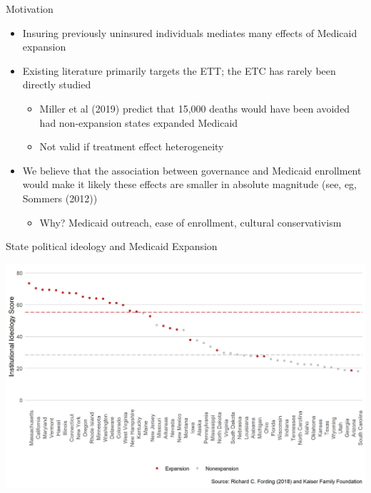 \documentclass[hyperref={pdfpagelabels=false}]{beamer}
\begin{document}
\begin{frame}{Motivation}
    \begin{itemize}
    \item Insuring previously uninsured individuals mediates many effects of Medicaid expansion \bigskip
    \item Existing literature primarily targets the ETT; the ETC has rarely been directly studied \bigskip
    \begin{itemize}
        \item Miller et al (2019) predict that 15,000 deaths would have been avoided had non-expansion states expanded Medicaid \bigskip
        \item Not valid if treatment effect heterogeneity \bigskip
    \end{itemize}
    \item We believe that the association between governance and Medicaid enrollment would make it likely these effects are smaller in absolute magnitude (see, eg, Sommers (2012)) \bigskip
    \begin{itemize}
        \item Why? Medicaid outreach, ease of enrollment, cultural conservativism
    \end{itemize}
    \end{itemize} 
\end{frame}

\begin{frame}{State political ideology and Medicaid Expansion}
    \begin{center}
	\includegraphics[scale=0.5]{01_Plots/political-expansion-plot.png}
    \end{center}
\end{frame}
\end{document}
